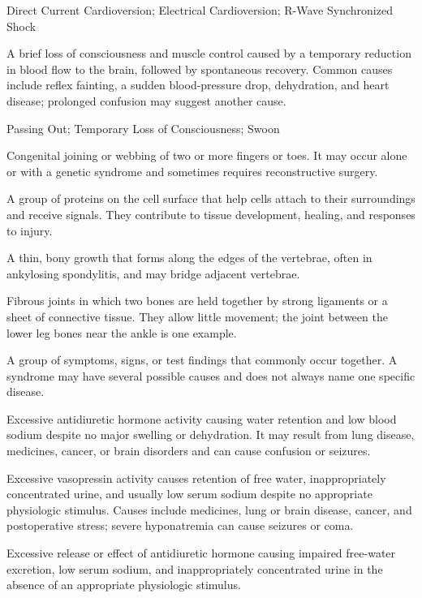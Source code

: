 \synonyms
Direct Current Cardioversion; Electrical Cardioversion; R-Wave Synchronized Shock

 A brief loss of consciousness and muscle control caused by a temporary reduction in blood flow to the brain, followed by spontaneous recovery. Common causes include reflex fainting, a sudden blood-pressure drop, dehydration, and heart disease; prolonged confusion may suggest another cause.

\synonyms
Passing Out; Temporary Loss of Consciousness; Swoon

 Congenital joining or webbing of two or more fingers or toes. It may occur alone or with a genetic syndrome and sometimes requires reconstructive surgery.

 A group of proteins on the cell surface that help cells attach to their surroundings and receive signals. They contribute to tissue development, healing, and responses to injury.

 A thin, bony growth that forms along the edges of the vertebrae, often in ankylosing spondylitis, and may bridge adjacent vertebrae.

 Fibrous joints in which two bones are held together by strong ligaments or a sheet of connective tissue. They allow little movement; the joint between the lower leg bones near the ankle is one example.

 A group of symptoms, signs, or test findings that commonly occur together. A syndrome may have several possible causes and does not always name one specific disease.

 Excessive antidiuretic hormone activity causing water retention and low blood sodium despite no major swelling or dehydration. It may result from lung disease, medicines, cancer, or brain disorders and can cause confusion or seizures.

 Excessive vasopressin activity causes retention of free water, inappropriately concentrated urine, and usually low serum sodium despite no appropriate physiologic stimulus. Causes include medicines, lung or brain disease, cancer, and postoperative stress; severe hyponatremia can cause seizures or coma.

 Excessive release or effect of antidiuretic hormone causing impaired free-water excretion, low serum sodium, and inappropriately concentrated urine in the absence of an appropriate physiologic stimulus.

